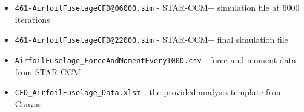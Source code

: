 \begin{itemize}
    \item \verb|461-AirfoilFuselageCFD@06000.sim| - STAR-CCM+ simulation file at \num{6000} iterations
    \item \verb|461-AirfoilFuselageCFD@22000.sim| - STAR-CCM+ final simulation file
    \item \verb|AirfoilFuselage_ForceAndMomentEvery1000.csv| - force and moment data from STAR-CCM+
    \item \verb|CFD_AirfoilFuselage_Data.xlsm| - the provided analysis template from Canvas
\end{itemize}
